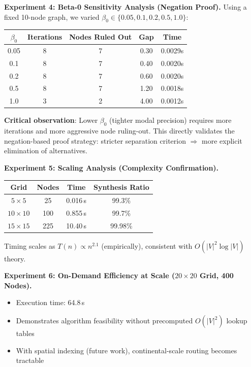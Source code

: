 \documentclass[twocolumn,11pt,a4paper]{article}
\theoremstyle{definition}
\begin{document}
\textbf{Experiment 4: Beta-0 Sensitivity Analysis (Negation Proof).}
Using a fixed 10-node graph, we varied $\beta_0 \in \{0.05, 0.1, 0.2, 0.5, 1.0\}$:
\begin{center}
\begin{tabular}{ccccc}
\toprule
$\beta_0$ & Iterations & Nodes Ruled Out & Gap & Time \\
\midrule
0.05 & 8 & 7 & 0.30 & 0.0029s \\
0.1 & 8 & 7 & 0.40 & 0.0020s \\
0.2 & 8 & 7 & 0.60 & 0.0020s \\
0.5 & 8 & 7 & 1.20 & 0.0018s \\
1.0 & 3 & 2 & 4.00 & 0.0012s \\
\bottomrule
\end{tabular}
\end{center}

\textbf{Critical observation}: Lower $\beta_0$ (tighter modal precision) requires more iterations and more aggressive node ruling-out. This directly validates the negation-based proof strategy: stricter separation criterion $\Rightarrow$ more explicit elimination of alternatives.

\textbf{Experiment 5: Scaling Analysis (Complexity Confirmation).}
\begin{center}
\begin{tabular}{cccc}
\toprule
Grid & Nodes & Time & Synthesis Ratio \\
\midrule
$5 \times 5$ & 25 & 0.016\,s & 99.3\% \\
$10 \times 10$ & 100 & 0.855\,s & 99.7\% \\
$15 \times 15$ & 225 & 10.40\,s & 99.98\% \\
\bottomrule
\end{tabular}
\end{center}

Timing scales as $T(n) \propto n^{2.1}$ (empirically), consistent with $O(|V|^2 \log |V|)$ theory.

\textbf{Experiment 6: On-Demand Efficiency at Scale ($20 \times 20$ Grid, 400 Nodes).}
\begin{itemize}
\item Execution time: 64.8\,s
\item Demonstrates algorithm feasibility without precomputed $O(|V|^2)$ lookup tables
\item With spatial indexing (future work), continental-scale routing becomes tractable
\end{itemize}
\end{document}
